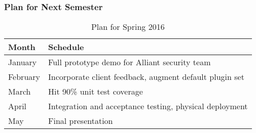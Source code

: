 \begin{frame}
\frametitle{Plan for Next Semester}

\begin{table}
\centering
\begin{tabularx}{\linewidth}{l | l}
\toprule
\textbf{Month} & \textbf{Schedule} \\
\midrule
January & Full prototype demo for Alliant security team \\
February & Incorporate client feedback, augment default plugin set \\
March & Hit 90\% unit test coverage \\
April & Integration and acceptance testing, physical deployment \\
May & Final presentation \\
\bottomrule
\end{tabularx}
\caption{Plan for Spring 2016}
\end{table}

\end{frame}
